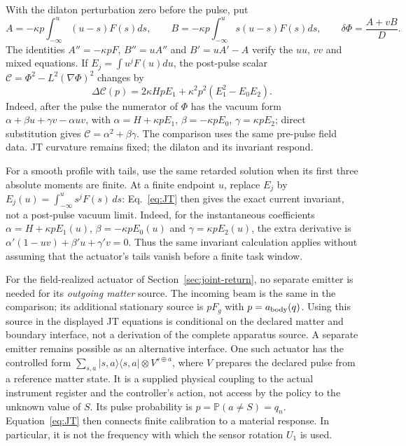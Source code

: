 \documentclass[11pt,a4paper]{article}
\newcommand{\Prb}{\mathbb P}
\begin{document}
With the dilaton perturbation zero before the pulse, put
\[
 A=-\kappa p\int_{-\infty}^u(u-s)F(s)ds,\qquad
 B=-\kappa p\int_{-\infty}^u s(u-s)F(s)ds,\qquad
 \delta\Phi=\frac{A+vB}{D}.
\]
The identities $A''=-\kappa pF$, $B''=uA''$ and $B'=uA'-A$ verify the $uu$, $vv$ and mixed equations. If $E_j=\int u^jF(u)du$, the post-pulse scalar $\mathcal C=\Phi^2-L^2(\nabla\Phi)^2$ changes by
\begin{equation}\label{eq:JT}
 \Delta\mathcal C(p)=2\kappa HpE_1+
 \kappa^2p^2(E_1^2-E_0E_2).
\end{equation}
Indeed, after the pulse the numerator of $\Phi$ has the vacuum form $\alpha+\beta u+\gamma v-\alpha uv$, with $\alpha=H+\kappa pE_1$, $\beta=-\kappa pE_0$, $\gamma=\kappa pE_2$; direct substitution gives $\mathcal C=\alpha^2+\beta\gamma$. The comparison uses the same pre-pulse field data. JT curvature remains fixed; the dilaton and its invariant respond.

For a smooth profile with tails, use the same retarded solution
when its first three absolute moments are finite. At a finite endpoint
$u$, replace $E_j$ by $E_j(u)=\int_{-\infty}^u s^jF(s)\,ds$:
Eq.~\eqref{eq:JT} then gives the exact current invariant, not a
post-pulse vacuum limit. Indeed, for the instantaneous coefficients
$\alpha=H+\kappa pE_1(u)$, $\beta=-\kappa pE_0(u)$ and
$\gamma=\kappa pE_2(u)$, the extra derivative is
$\alpha'(1-uv)+\beta'u+\gamma'v=0$. Thus the same invariant
calculation applies without assuming that the actuator's tails
vanish before a finite task window.

For the field-realized actuator of Section~\ref{sec:joint-return},
no separate emitter is needed for its \emph{outgoing matter} source.
The incoming beam is the same in the comparison; its additional
stationary source is $pF_g$ with $p=a_{\rm body}(q)$.
Using this source in the displayed JT equations is conditional on
the declared matter and boundary interface, not a derivation of
the complete apparatus source. A separate emitter remains possible as an alternative interface. One such actuator has the controlled form $\sum_{s,a}|s,a\rangle\langle s,a|\otimes V^{s\oplus a}$, where $V$ prepares the declared pulse from a reference matter state. It is a supplied physical coupling to the actual instrument register and the controller's action, not access by the policy to the unknown value of $S$. Its pulse probability is $p=\Prb(a\ne S)=q_n$. Equation~\eqref{eq:JT} then connects finite calibration to a material response. In particular, it is not the frequency with which the sensor rotation $U_1$ is used.
\end{document}
